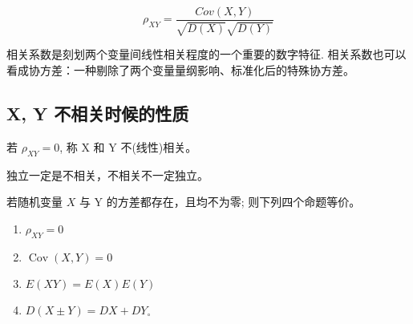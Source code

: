 $$
 \rho_{XY} =   \frac{Cov(X,Y) }{\sqrt{D(X)} \sqrt{D(Y)}}
$$

相关系数是刻划两个变量间线性相关程度的一个重要的数字特征. 相关系数也可以看成协方差：一种剔除了两个变量量纲影响、标准化后的特殊协方差。

\subsection{X, Y 不相关时候的性质}

若 $\rho_{X Y}=0$, 称 X 和 Y 不(线性)相关。

\begin{corollary}
    独立一定是不相关，不相关不一定独立。
\end{corollary}

\begin{theorem}
    若随机变量 $X$ 与 Y 的方差都存在，且均不为零; 则下列四个命题等价。
    \begin{enumerate}
        \item $\rho_{X Y}=0$
        \item $\operatorname{Cov}(X, Y)=0$
        \item $E(X Y)=E (X) E (Y)$
        \item $D(X \pm Y)=D X+D Y_{\circ}$
    \end{enumerate}
\end{theorem}
